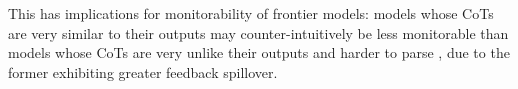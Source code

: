 \documentclass{article}
\begin{document}
This has implications for monitorability of frontier models: models whose CoTs are very similar to their outputs \citep{anthropic2026mythos5transcript} may counter-intuitively be less monitorable than models whose CoTs are very unlike their outputs and harder to parse \citep{schoen2025antischeming,jose2025illegible}, due to the former exhibiting greater feedback spillover.



\end{document}
